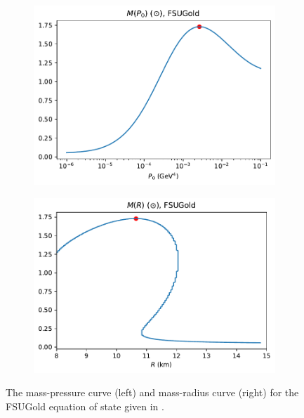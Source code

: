 \begin{figure}[h!]
    \centering
    \begin{subfigure}{.5\textwidth}
        \includegraphics[width=\textwidth]{images/adv/p0_analysis,FSUGold.pdf}
    \end{subfigure}%
    \begin{subfigure}{.5\textwidth}
        \includegraphics[width=\textwidth]{images/adv/r_analysis,FSUGold.pdf}
    \end{subfigure}
    \caption{The mass-pressure curve (left) and mass-radius curve (right) for the FSUGold equation of state given in \autocite{diener_2008}.}
    \label{fig: fsugold mass radius pressure}
\end{figure}

